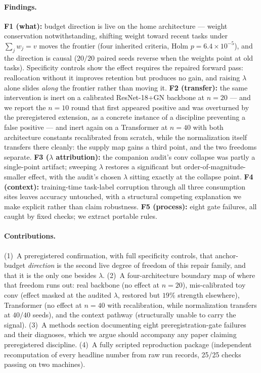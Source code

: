 \documentclass[10pt]{article}
\begin{document}
\paragraph{Findings.}
\textbf{F1 (what):} budget direction is live on the home architecture ---
weight conservation notwithstanding, shifting weight toward recent tasks
under $\sum_j w_j = v$ moves the frontier (four inherited criteria, Holm
$p=6.4\times10^{-5}$), and the direction is causal ($20/20$ paired seeds
reverse when the weights point at old tasks). Specificity controls show the
effect requires the repaired forward pass: reallocation without it improves
retention but produces no gain, and raising $\lambda$ alone slides
\emph{along} the frontier rather than moving it.
\textbf{F2 (transfer):} the same intervention is inert on a calibrated
ResNet-18+GN backbone at $n{=}20$ --- and we report the $n{=}10$ round that
first appeared positive and was overturned by the preregistered extension,
as a concrete instance of a discipline preventing a false positive ---
and inert again on a Transformer at $n{=}40$ with both architecture
constants recalibrated from scratch, while the normalization itself
transfers there cleanly: the supply map gains a third point, and the two
freedoms separate.
\textbf{F3 ($\lambda$ attribution):} the companion audit's conv collapse was
partly a single-point artifact; sweeping $\lambda$ restores a significant but
order-of-magnitude-smaller effect, with the audit's chosen $\lambda$
sitting exactly at the collapse point.
\textbf{F4 (context):} training-time task-label corruption through all three
consumption sites leaves accuracy untouched, with a structural competing
explanation we make explicit rather than claim robustness.
\textbf{F5 (process):} eight gate failures, all caught by fixed checks; we
extract portable rules.

\paragraph{Contributions.}
(1)~A preregistered confirmation, with full specificity controls, that
anchor-budget \emph{direction} is the second live degree of freedom of this
repair family, and that it is the only one besides $\lambda$.
(2)~A four-architecture boundary map of where that freedom runs out: real
backbone (no effect at $n{=}20$), mis-calibrated toy conv (effect masked at
the audited $\lambda$, restored but $19\%$ strength elsewhere), Transformer
(no effect at $n{=}40$ with recalibration, while normalization transfers at
$40/40$ seeds), and the context pathway (structurally unable to carry the
signal).
(3)~A methods section documenting eight preregistration-gate failures and
their diagnoses, which we argue should accompany any paper claiming
preregistered discipline.
(4)~A fully scripted reproduction package (independent recomputation of
every headline number from raw run records, 25/25 checks passing on two
machines).
\end{document}
